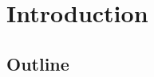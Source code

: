 \chapter{Introduction}
\label{ch:introduction}
\glsresetall %
\lipsum[1-5]


\section{Outline}
\lipsum[1]



